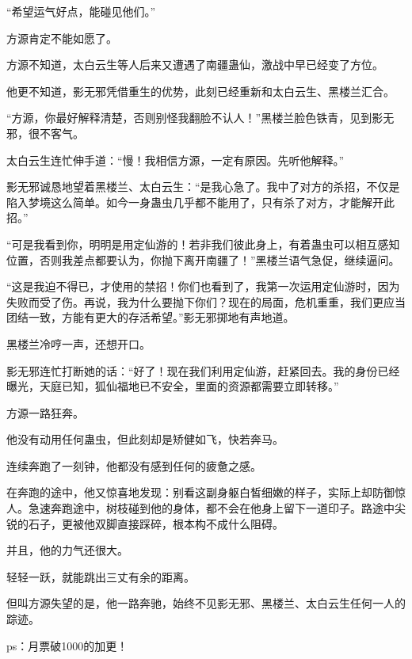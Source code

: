 \begin{this_body}
“希望运气好点，能碰见他们。”

方源肯定不能如愿了。

方源不知道，太白云生等人后来又遭遇了南疆蛊仙，激战中早已经变了方位。

他更不知道，影无邪凭借重生的优势，此刻已经重新和太白云生、黑楼兰汇合。

“方源，你最好解释清楚，否则别怪我翻脸不认人！”黑楼兰脸色铁青，见到影无邪，很不客气。

太白云生连忙伸手道：“慢！我相信方源，一定有原因。先听他解释。”

影无邪诚恳地望着黑楼兰、太白云生：“是我心急了。我中了对方的杀招，不仅是陷入梦境这么简单。如今一身蛊虫几乎都不能用了，只有杀了对方，才能解开此招。”

“可是我看到你，明明是用定仙游的！若非我们彼此身上，有着蛊虫可以相互感知位置，否则我差点都要认为，你抛下离开南疆了！”黑楼兰语气急促，继续逼问。

“这是我迫不得已，才使用的禁招！你们也看到了，我第一次运用定仙游时，因为失败而受了伤。再说，我为什么要抛下你们？现在的局面，危机重重，我们更应当团结一致，方能有更大的存活希望。”影无邪掷地有声地道。

黑楼兰冷哼一声，还想开口。

影无邪连忙打断她的话：“好了！现在我们利用定仙游，赶紧回去。我的身份已经曝光，天庭已知，狐仙福地已不安全，里面的资源都需要立即转移。”

方源一路狂奔。

他没有动用任何蛊虫，但此刻却是矫健如飞，快若奔马。

连续奔跑了一刻钟，他都没有感到任何的疲惫之感。

在奔跑的途中，他又惊喜地发现：别看这副身躯白皙细嫩的样子，实际上却防御惊人。急速奔跑途中，树枝碰到他的身体，都不会在他身上留下一道印子。路途中尖锐的石子，更被他双脚直接踩碎，根本构不成什么阻碍。

并且，他的力气还很大。

轻轻一跃，就能跳出三丈有余的距离。

但叫方源失望的是，他一路奔驰，始终不见影无邪、黑楼兰、太白云生任何一人的踪迹。

ps：月票破1000的加更！

\end{this_body}


